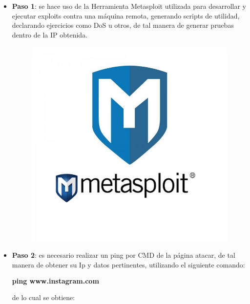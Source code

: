 \documentclass[a4paper,11pt]{article}
\theoremstyle{mytheor}
\begin{document}
\begin{itemize}
    \item \textbf{Paso 1}: se hace uso de la Herramienta Metasploit utilizada para desarrollar y ejecutar exploits contra una máquina remota, generando scripts de utilidad, declarando ejercicios como DoS u otros, de tal manera de generar pruebas dentro de la IP obtenida.
  

    
    \begin{figure}[!h]
    \centering
    \includegraphics[scale=0.3]{meta.jpg}
    \label{fig:my_label}
    \end{figure}
    
   
    
    
    \item \textbf{Paso 2}: es necesario realizar un ping por CMD de la página atacar, de tal manera de obtener su Ip y datos pertinentes, utilizando el siguiente comando:
    
    \begin{center}
        \textbf{ping www.instagram.com}
    \end{center}
    
    de lo cual se obtiene:
    

\end{itemize}
\end{document}
